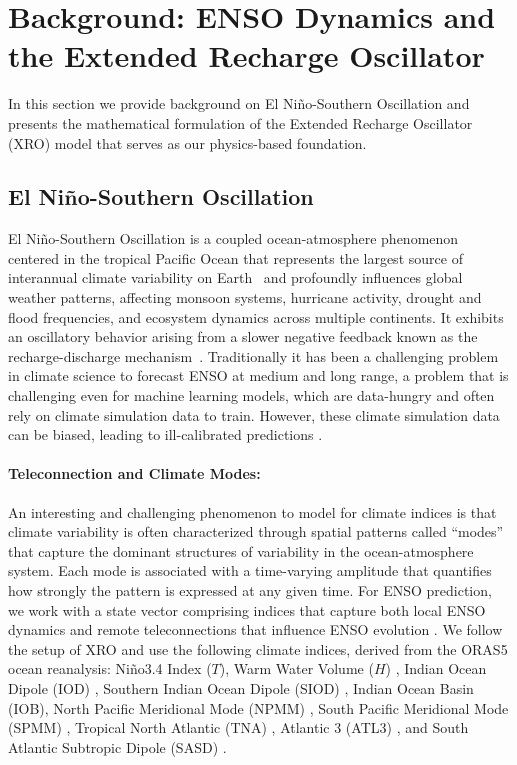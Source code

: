 \section{Background: ENSO Dynamics and the Extended Recharge Oscillator}
\label{sec:background}

In this section we provide background on El Ni\~no-Southern Oscillation and presents the mathematical formulation of the Extended Recharge Oscillator (XRO) model that serves as our physics-based foundation.

\subsection{El Ni\~no-Southern Oscillation}

El Ni\~no-Southern Oscillation is a coupled ocean-atmosphere phenomenon centered in the tropical Pacific Ocean that represents the largest source of interannual climate variability on Earth~\cite{mcphaden2006enso,timmermann2018enso} and profoundly influences global weather patterns, affecting monsoon systems, hurricane activity, drought and flood frequencies, and ecosystem dynamics across multiple continents. It exhibits an oscillatory behavior arising from a slower negative feedback known as the recharge-discharge mechanism~\cite{jin1997equatorial}. Traditionally it has been a challenging problem in climate science to forecast ENSO at medium and long range, a problem that is challenging even for machine learning models, which are data-hungry and often rely on climate simulation data to train. However, these climate simulation data can be biased, leading to ill-calibrated predictions \cite{KimJeongJin2017SciRep, Capotondi2015ModelBiasesENSO}. 


\paragraph{Teleconnection and Climate Modes: } An interesting and challenging phenomenon to model for climate indices is that climate variability is often characterized through spatial patterns called ``modes'' that capture the dominant structures of variability in the ocean-atmosphere system. Each mode is associated with a time-varying amplitude  that quantifies how strongly the pattern is expressed at any given time. For ENSO prediction, we work with a state vector comprising indices that capture both local ENSO dynamics and remote teleconnections that influence ENSO evolution \cite{bjerknes1969atmospheric}. We follow the setup of XRO \cite{zhao2024xro} and use the following climate indices, derived from the ORAS5 ocean reanalysis\cite{zuo2019oras5}: Ni\~no3.4 Index ($T$),  Warm Water Volume ($H$) \cite{meinen2000observations}, Indian Ocean Dipole (IOD) \cite{saji1999dipole}, Southern Indian Ocean Dipole (SIOD) \cite{Jo2022SIOD_CPEN}, Indian Ocean Basin (IOB), North Pacific Meridional Mode (NPMM) \cite{chiang2002tropical}, South Pacific Meridional Mode (SPMM)  \cite{ZhangClementDiNezio2014SPMM}, Tropical North Atlantic (TNA) \cite{HamEtAl2013NTAENSOTrigger}, Atlantic 3 (ATL3) \cite{HamKugPark2013AtlanticRoles},  and South Atlantic Subtropic Dipole (SASD) \cite{HamEtAl2021SouthAtlanticENSO}. 


